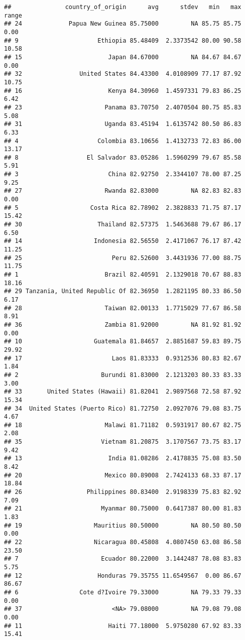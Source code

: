 \documentclass[
]{article}
\begin{document}
\begin{verbatim}
##               country_of_origin      avg      stdev   min   max range
## 24             Papua New Guinea 85.75000         NA 85.75 85.75  0.00
## 9                      Ethiopia 85.48409  2.3373542 80.00 90.58 10.58
## 15                        Japan 84.67000         NA 84.67 84.67  0.00
## 32                United States 84.43300  4.0108909 77.17 87.92 10.75
## 16                        Kenya 84.30960  1.4597331 79.83 86.25  6.42
## 23                       Panama 83.70750  2.4070504 80.75 85.83  5.08
## 31                       Uganda 83.45194  1.6135742 80.50 86.83  6.33
## 4                      Colombia 83.10656  1.4132733 72.83 86.00 13.17
## 8                   El Salvador 83.05286  1.5960299 79.67 85.58  5.91
## 3                         China 82.92750  2.3344107 78.00 87.25  9.25
## 27                       Rwanda 82.83000         NA 82.83 82.83  0.00
## 5                    Costa Rica 82.78902  2.3828833 71.75 87.17 15.42
## 30                     Thailand 82.57375  1.5463688 79.67 86.17  6.50
## 14                    Indonesia 82.56550  2.4171067 76.17 87.42 11.25
## 25                         Peru 82.52600  3.4431936 77.00 88.75 11.75
## 1                        Brazil 82.40591  2.1329018 70.67 88.83 18.16
## 29 Tanzania, United Republic Of 82.36950  1.2821195 80.33 86.50  6.17
## 28                       Taiwan 82.00133  1.7715029 77.67 86.58  8.91
## 36                       Zambia 81.92000         NA 81.92 81.92  0.00
## 10                    Guatemala 81.84657  2.8851687 59.83 89.75 29.92
## 17                         Laos 81.83333  0.9312536 80.83 82.67  1.84
## 2                       Burundi 81.83000  2.1213203 80.33 83.33  3.00
## 33       United States (Hawaii) 81.82041  2.9897568 72.58 87.92 15.34
## 34  United States (Puerto Rico) 81.72750  2.0927076 79.08 83.75  4.67
## 18                       Malawi 81.71182  0.5931917 80.67 82.75  2.08
## 35                      Vietnam 81.20875  3.1707567 73.75 83.17  9.42
## 13                        India 81.08286  2.4178835 75.08 83.50  8.42
## 20                       Mexico 80.89008  2.7424133 68.33 87.17 18.84
## 26                  Philippines 80.83400  2.9198339 75.83 82.92  7.09
## 21                      Myanmar 80.75000  0.6417387 80.00 81.83  1.83
## 19                    Mauritius 80.50000         NA 80.50 80.50  0.00
## 22                    Nicaragua 80.45808  4.0807450 63.08 86.58 23.50
## 7                       Ecuador 80.22000  3.1442487 78.08 83.83  5.75
## 12                     Honduras 79.35755 11.6549567  0.00 86.67 86.67
## 6                 Cote d?Ivoire 79.33000         NA 79.33 79.33  0.00
## 37                         <NA> 79.08000         NA 79.08 79.08  0.00
## 11                        Haiti 77.18000  5.9750280 67.92 83.33 15.41
\end{verbatim}
\end{document}
